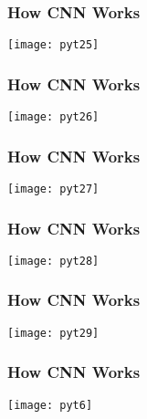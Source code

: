 \begin{frame}[fragile] \frametitle{How CNN Works}
\begin{center}
\texttt{[image: pyt25]}
\end{center}

\end{frame}

\begin{frame}[fragile] \frametitle{How CNN Works}
\begin{center}
\texttt{[image: pyt26]}
\end{center}

\end{frame}

\begin{frame}[fragile] \frametitle{How CNN Works}
\begin{center}
\texttt{[image: pyt27]}
\end{center}

\end{frame}


\begin{frame}[fragile] \frametitle{How CNN Works}
\begin{center}
\texttt{[image: pyt28]}
\end{center}

\end{frame}
\begin{frame}[fragile] \frametitle{How CNN Works}
\begin{center}
\texttt{[image: pyt29]}
\end{center}

\end{frame}


\begin{frame}[fragile] \frametitle{How CNN Works}
\begin{center}
\texttt{[image: pyt6]}
\end{center}

\end{frame}

